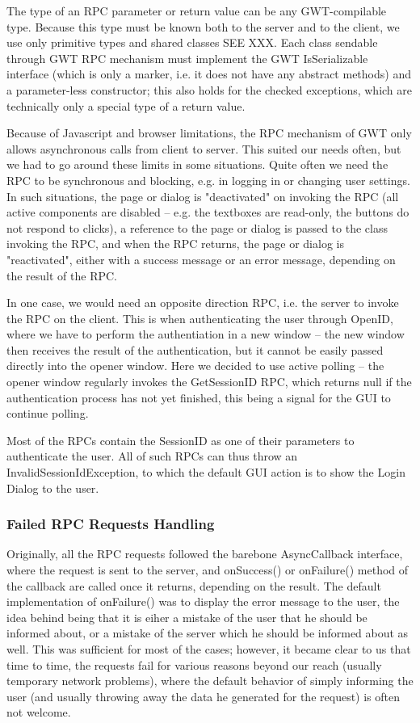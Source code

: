 The type of an RPC parameter or return value can be any GWT-compilable type. Because this type must be known both to the server and to the client, we use only primitive types and shared classes SEE XXX. Each class sendable through GWT RPC mechanism must implement the GWT IsSerializable interface (which is only a marker, i.e. it does not have any abstract methods) and a parameter-less constructor; this also holds for the checked exceptions, which are technically only a special type of a return value.

Because of Javascript and browser limitations, the RPC mechanism of GWT only allows asynchronous calls from client to server. This suited our needs often, but we had to go around these limits in some situations. Quite often we need the RPC to be synchronous and blocking, e.g. in logging in or changing user settings. In such situations, the page or dialog is "deactivated" on invoking the RPC (all active components are disabled -- e.g. the textboxes are read-only, the buttons do not respond to clicks), a reference to the page or dialog is passed to the class invoking the RPC, and when the RPC returns, the page or dialog is "reactivated", either with a success message or an error message, depending on the result of the RPC.

In one case, we would need an opposite direction RPC, i.e. the server to invoke the RPC on the client. This is when authenticating the user through OpenID, where we have to perform the authentiation in a new window -- the new window then receives the result of the authentication, but it cannot be easily passed directly into the opener window. Here we decided to use active polling -- the opener window regularly invokes the GetSessionID RPC, which returns null if the authentication process has not yet finished, this being a signal for the GUI to continue polling.

Most of the RPCs contain the SessionID as one of their parameters to authenticate the user. All of such RPCs can thus throw an InvalidSessionIdException, to which the default GUI action is to show the Login Dialog to the user.

\subsubsection{Failed RPC Requests Handling}

Originally, all the RPC requests followed the barebone AsyncCallback interface, where the request is sent to the server, and onSuccess() or onFailure() method of the callback are called once it returns, depending on the result. The default implementation of onFailure() was to display the error message to the user, the idea behind being that it is eiher a mistake of the user that he should be informed about, or a mistake of the server which he should be informed about as well. This was sufficient for most of the cases; however, it became clear to us that time to time, the requests fail for various reasons beyond our reach (usually temporary network problems), where the default behavior of simply informing the user (and usually throwing away the data he generated for the request) is often not welcome.

